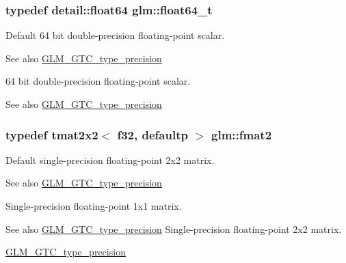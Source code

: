 \subsubsection[{float64\+\_\+t}]{\setlength{\rightskip}{0pt plus 5cm}typedef detail\+::float64 {\bf glm\+::float64\+\_\+t}}\label{group__gtc__type__precision_gade966a3eb25ebeb16dd53c40d3fdeb46}
Default 64 bit double-\/precision floating-\/point scalar. \begin{DoxySeeAlso}{See also}
\hyperlink{group__gtc__type__precision}{G\+L\+M\+\_\+\+G\+T\+C\+\_\+type\+\_\+precision}
\end{DoxySeeAlso}
64 bit double-\/precision floating-\/point scalar. \begin{DoxySeeAlso}{See also}
\hyperlink{group__gtc__type__precision}{G\+L\+M\+\_\+\+G\+T\+C\+\_\+type\+\_\+precision} 
\end{DoxySeeAlso}
\hypertarget{group__gtc__type__precision_gab8e1ce0a2648cfcd645eed2d8ea96f21}{}
\subsubsection[{fmat2}]{\setlength{\rightskip}{0pt plus 5cm}typedef tmat2x2$<$ f32, defaultp $>$ {\bf glm\+::fmat2}}\label{group__gtc__type__precision_gab8e1ce0a2648cfcd645eed2d8ea96f21}
Default single-\/precision floating-\/point 2x2 matrix. \begin{DoxySeeAlso}{See also}
\hyperlink{group__gtc__type__precision}{G\+L\+M\+\_\+\+G\+T\+C\+\_\+type\+\_\+precision}
\end{DoxySeeAlso}
Single-\/precision floating-\/point 1x1 matrix. \begin{DoxySeeAlso}{See also}
\hyperlink{group__gtc__type__precision}{G\+L\+M\+\_\+\+G\+T\+C\+\_\+type\+\_\+precision} Single-\/precision floating-\/point 2x2 matrix. 

\hyperlink{group__gtc__type__precision}{G\+L\+M\+\_\+\+G\+T\+C\+\_\+type\+\_\+precision} 
\end{DoxySeeAlso}
\hypertarget{group__gtc__type__precision_ga20fdbcc6b16bed27ad25db9b71d09e93}{}
